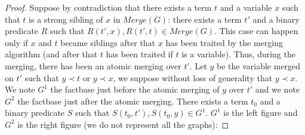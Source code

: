 \documentclass{article}
\theoremstyle{definition}
\theoremstyle{remark}
\newcommand{\Merge}{\textit{Merge}}
\begin{document}
\begin{proof}
Suppose by contradiction that there exists a term $t$ and a variable $x$ such that $t$ is a strong sibling of $x$ in $\Merge(G)$: there exists a term $t'$ and a binary predicate $R$ such that $R(t',x),R(t',t) \in \Merge(G)$. This case can happen only if $x$ and $t$ became siblings after that $x$ has been traited by the merging algorithm (and  after that $t$ has been traited if $t$ is a variable). Thus, during the merging, there has been an atomic merging over $t'$. Let $y$ be the variable merged on $t'$ such that $y \prec t$ or $y \prec x$, we suppose without loss of generality that $y \prec x$. We note $G^1$ the factbase just before the atomic merging of $y$ over $t'$ and we note $G^2$ the factbase just after the atomic merging. There exists a term $t_0$ and a binary predicate $S$ such that $S(t_0,t'),S(t_0,y) \in G^1$. $G^1$ is the left figure and $G^2$ is the right figure (we do not represent all the graphs):


\end{proof}
\end{document}
